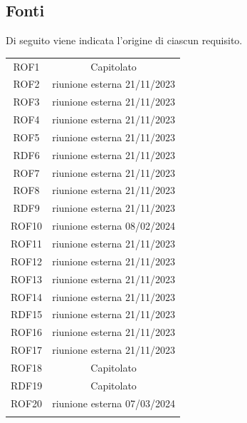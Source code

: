 \documentclass{article}
\newcommand{\custombold}{\contour{black}}
\begin{document}
\subsection{Fonti}
Di seguito viene indicata l'origine di ciascun requisito.\\
\begin{center}
\begin{tabular}{c|c}
\hline
\rowcolor{Blue}
\custombold{ID}&\custombold{Fonte}\\
\hline
\rowcolor{LighterBlue}
ROF1 & Capitolato\\
\hline
\rowcolor{LightBlue}
ROF2 & riunione esterna 21/11/2023\\
\hline
\rowcolor{LighterBlue}
ROF3 & riunione esterna 21/11/2023\\
\hline
\rowcolor{LightBlue}
ROF4 & riunione esterna 21/11/2023\\
\hline
\rowcolor{LighterBlue}
ROF5 & riunione esterna 21/11/2023\\
\hline
\rowcolor{LightBlue}
RDF6 & riunione esterna 21/11/2023\\
\hline
\rowcolor{LighterBlue}
ROF7 & riunione esterna 21/11/2023\\
\hline
\rowcolor{LightBlue}
ROF8 & riunione esterna 21/11/2023\\
\hline
\rowcolor{LighterBlue}
RDF9 & riunione esterna 21/11/2023\\
\hline
\rowcolor{LightBlue}
ROF10 & riunione esterna 08/02/2024\\
\hline
\rowcolor{LighterBlue}
ROF11 & riunione esterna 21/11/2023\\
\hline
\rowcolor{LightBlue}
ROF12 & riunione esterna 21/11/2023\\
\hline
\rowcolor{LighterBlue}
ROF13 & riunione esterna 21/11/2023\\
\hline
\rowcolor{LightBlue}
ROF14 & riunione esterna 21/11/2023\\
\hline
\rowcolor{LighterBlue}
RDF15 & riunione esterna 21/11/2023\\
\hline
\rowcolor{LightBlue}
ROF16 & riunione esterna 21/11/2023\\
\hline
\rowcolor{LighterBlue}
ROF17 & riunione esterna 21/11/2023\\
\hline
\rowcolor{LightBlue}
ROF18 & Capitolato\\
\hline
\rowcolor{LighterBlue}
RDF19 & Capitolato\\
\hline
\rowcolor{LightBlue}
ROF20 & riunione esterna 07/03/2024\\
\hline
\rowcolor{LighterBlue}

\end{tabular}
\end{center}
\end{document}
